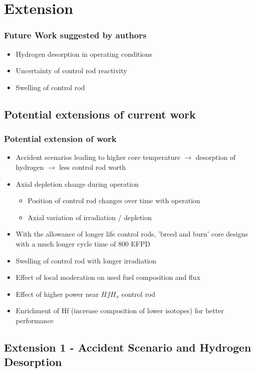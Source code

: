 \documentclass[9pt]{beamer}
\newcommand{\hfh}{$HfH_{x}$\xspace}
\begin{document}
\section{Extension}


\begin{frame}
\frametitle{Future Work suggested by authors}
\begin{itemize}
  \item Hydrogen desorption in operating conditions
  \item Uncertainty of control rod reactivity
  \item Swelling of control rod
\end{itemize}
\end{frame}


\subsection{Potential extensions of current work }
\begin{frame}
\frametitle{Potential extension of work}
\begin{itemize}
  \item Accident scenarios
    leading to higher core temperature $\rightarrow$ desorption of hydrogen $\rightarrow$ less control rod worth
  \item Axial depletion change during operation
  \begin{itemize}
      \item Position of control rod changes over time with operation
      \item Axial variation of irradiation / depletion
  \end{itemize}
  \item With the allowance of longer life control rods, 'breed and burn'
  core designs with a much longer cycle time of 800 EFPD
  \item Swelling of control rod with longer irradiation
  \item Effect of local moderation on used fuel composition and flux
  \item Effect of higher power near \hfh control rod
  \item Enrichment of Hf (increase composition of lower isotopes) for better performance
\end{itemize}
\end{frame}

\subsection{Extension 1 - Accident Scenario and Hydrogen Desorption}
\end{document}
